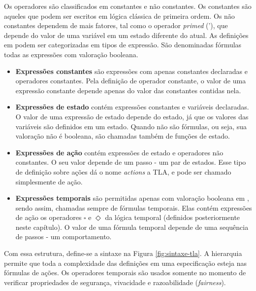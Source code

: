 Os operadores são classificados em constantes e não constantes. Os constantes são aqueles que podem ser escritos em lógica clássica de primeira ordem. Os não constantes dependem de mais fatores, tal como o operador \textit{primed} ('), que depende do valor de uma variável em um estado diferente do atual. As definições em \TLA podem ser categorizadas em tipos de expressão. São denominadas fórmulas todas as expressões com valoração booleana.
\begin{itemize}
  \item \textbf{Expressões constantes} são expressões com apenas constantes declaradas e operadores constantes. Pela definição de operador constante, o valor de uma expressão constante depende apenas do valor das constantes contidas nela.
  \item \textbf{Expressões de estado} contém expressões constantes e variáveis declaradas. O valor de uma expressão de estado depende do estado, já que os valores das variáveis são definidos em um estado. Quando não são fórmulas, ou seja, sua valoração não é booleana, são chamadas também de funções de estado.
  \item \textbf{Expressões de ação} contém expressões de estado e operadores não constantes. O seu valor depende de um passo - um par de estados. Esse tipo de definição sobre ações dá o nome \textit{actions} a TLA, e pode ser chamado simplesmente de ação.
  \item \textbf{Expressões temporais} são permitidas apenas com valoração booleana em \TLA, sendo assim, chamadas sempre de fórmulas temporais. Elas contém expressões de ação os operadores $\square$ e $\Diamond$ da lógica temporal (definidos posteriormente neste capítulo). O valor de uma fórmula temporal depende de uma sequência de passos - um comportamento.
\end{itemize}

Com essa estrutura, define-se a sintaxe na Figura \ref{fig:sintaxe-tla}. A hierarquia permite que toda a complexidade das definições em uma especificação esteja nas fórmulas de ações. Os operadores temporais são usados somente no momento de verificar propriedades de segurança, vivacidade e razoabilidade (\textit{fairness}).

